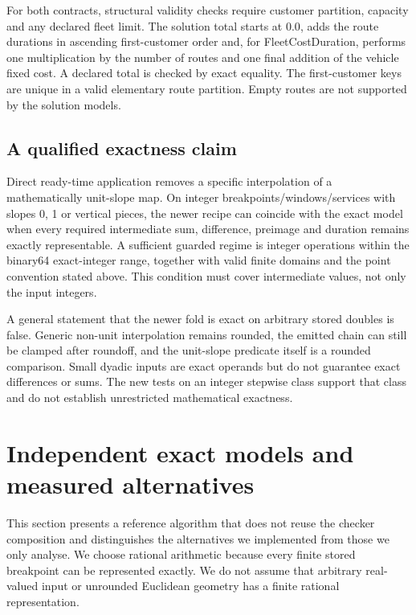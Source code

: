 For both contracts, structural validity checks require customer partition, capacity and any declared fleet limit. The solution total starts at $0.0$, adds the route durations in ascending first-customer order and, for FleetCostDuration, performs one multiplication by the number of routes and one final addition of the vehicle fixed cost. A declared total is checked by exact equality. The first-customer keys are unique in a valid elementary route partition. Empty routes are not supported by the solution models.

\subsection{A qualified exactness claim}

Direct ready-time application removes a specific interpolation of a mathematically unit-slope map. On integer breakpoints/windows/services with slopes 0, 1 or vertical pieces, the newer recipe can coincide with the exact model when every required intermediate sum, difference, preimage and duration remains exactly representable. A sufficient guarded regime is integer operations within the binary64 exact-integer range, together with valid finite domains and the point convention stated above. This condition must cover intermediate values, not only the input integers.

A general statement that the newer fold is exact on arbitrary stored doubles is false. Generic non-unit interpolation remains rounded, the emitted chain can still be clamped after roundoff, and the unit-slope predicate itself is a rounded comparison. Small dyadic inputs are exact operands but do not guarantee exact differences or sums. The new tests on an integer stepwise class support that class and do not establish unrestricted mathematical exactness.


\section{Independent exact models and measured alternatives}\label{sec:oracle}

This section presents a reference algorithm that does not reuse the checker composition and distinguishes the alternatives we implemented from those we only analyse. We choose rational arithmetic because every finite stored breakpoint can be represented exactly. We do not assume that arbitrary real-valued input or unrounded Euclidean geometry has a finite rational representation.


